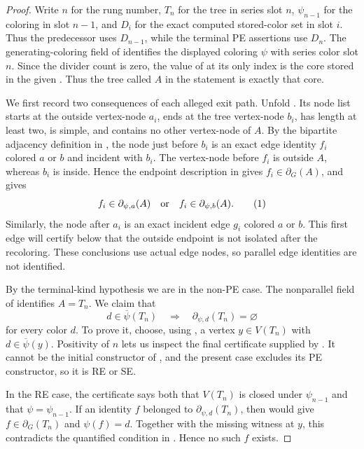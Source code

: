 \begin{proof}
Write $n$ for the rung number, $T_n$ for the tree in series slot $n$,
$\psi_{n-1}$ for the coloring in slot $n-1$, and $D_i$ for the exact
computed stored-color set in slot $i$.  Thus the predecessor uses
$D_{n-1}$, while the terminal PE assertions use $D_n$.  The
generating-coloring field of  identifies
the displayed coloring $\psi$ with series color slot $n$.  Since
the divider count is zero, the value of
 at its only index is the core stored in
the given .  Thus the tree called $A$ in the
statement is exactly that core.

We first record two consequences of each alleged exit path.  Unfold
.  Its node list starts at the outside vertex-node
$a_i$, ends at the tree vertex-node $b_i$, has length at least two, is
simple, and contains no other vertex-node of $A$.  By the bipartite
adjacency definition in , the node just
before $b_i$ is an exact edge identity $f_i$ colored $a$ or $b$ and
incident with $b_i$.  The vertex-node before $f_i$ is outside $A$,
whereas $b_i$ is inside.  Hence the endpoint description in
 gives $f_i\in\partial_G(A)$, and
 gives
\[
 f_i\in\partial_{\psi,a}(A)\quad\hbox{or}\quad
 f_i\in\partial_{\psi,b}(A).                         \tag{1}
\]
Similarly, the node after $a_i$ is an exact incident edge $g_i$ colored
$a$ or $b$.  This first edge will certify below that the outside endpoint
is not isolated after the recoloring.  These conclusions use actual edge
nodes, so parallel edge identities are not identified.

By the terminal-kind hypothesis we are in the non-PE case.
The nonparallel field of  identifies
$A=T_n$.  We claim that
\[
 d\in\overline\psi(T_n)\quad\Longrightarrow\quad
 \partial_{\psi,d}(T_n)=\varnothing                 \tag{2}
\]
for every color $d$.  To prove it, choose, using
, a vertex $y\in V(T_n)$ with
$d\in\overline\psi(y)$.  Positivity of $n$ lets us inspect the final
certificate supplied by .  It cannot be the
initial constructor of , and the present
case excludes its PE constructor, so it is RE or SE.

In the RE case, the certificate says both that $V(T_n)$ is closed under
$\psi_{n-1}$ and that $\psi=\psi_{n-1}$.  If an identity $f$ belonged to
$\partial_{\psi,d}(T_n)$, then
 would give
$f\in\partial_G(T_n)$ and $\psi(f)=d$.  Together with the missing witness
at $y$, this contradicts the quantified condition in
.  Hence no such $f$ exists.


\end{proof}
